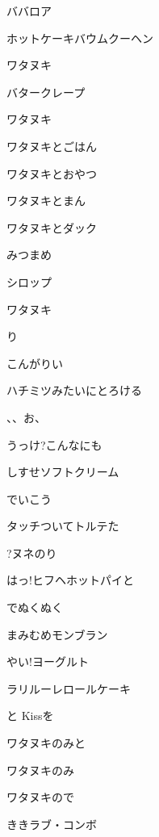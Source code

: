 \documentclass[14pt]{ltjsarticle}
\begin{document}
{  ババロア
  \jisho{}

  ホットケーキバウムクーヘン
  \jisho{}

  ワタヌキ
  \jisho{}

  バタークレープ
  \jisho{}

  ワタヌキ
  \jisho{}

\item
  ワタヌキとごはん
  \jisho{}

  ワタヌキとおやつ
  \jisho{}

  ワタヌキとまん
  \jisho{}

  ワタヌキとダック
  \jisho{}

\item
  みつまめ
  \jisho{}

  シロップ
  \jisho{}

  ワタヌキ
  \jisho{}

  り
  \jisho{}

\item
  こんがりい
  \jisho{}

  ハチミツみたいにとろける
  \jisho{}

\item
  、、お、
  \jisho{}

  うっけ?こんなにも
  \jisho{}

  しすせソフトクリーム
  \jisho{}

  でいこう
  \jisho{}

  タッチついてトルテた
  \jisho{}

  ?ヌネのり
  \jisho{}

  はっ!ヒフヘホットパイと
  \jisho{}

  でぬくぬく
  \jisho{}

\item
  まみむめモンブラン
  \jisho{}

  やい!ヨーグルト
  \jisho{}

  ラリルーレロールケーキ
  \jisho{}

  と Kissを
  \jisho{}

  ワタヌキのみと
  \jisho{}

  ワタヌキのみ
  \jisho{}

  ワタヌキので
  \jisho{}

  ききラブ・コンボ
  \jisho{}

  
}
\end{document}
